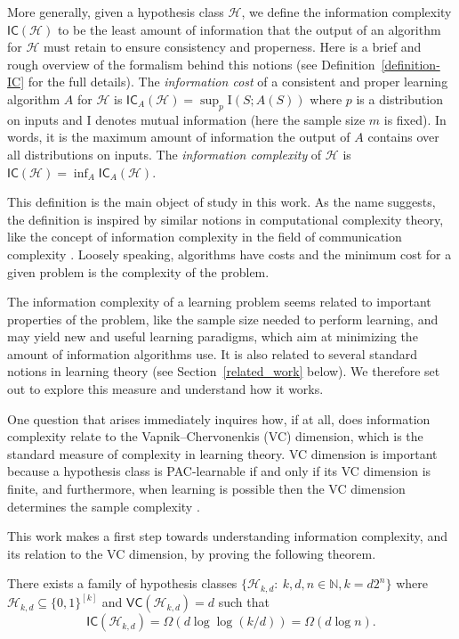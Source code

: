 \documentclass[final,12pt]{colt2018}
\newcommand{\mc}[1]{\mathcal{#1}}
\newcommand{\cH}{\mc{H}}
\newcommand{\II}[1]{\mathrm{I}\left(#1\right)}
\newcommand{\IC}{\mathsf{IC}}
\newcommand{\VC}{\mathsf{VC}}
\begin{document}
More generally, given a hypothesis class $\cH$, we define the information complexity $\IC(\cH)$ to be the least amount of information that the output of an algorithm for $\cH$ must retain to ensure consistency and properness. 
{Here is a brief and rough overview of the formalism behind this notions
(see Definition~\ref{definition-IC} for the full details).
The {\em information cost} of a consistent and proper learning algorithm $A$ for $\cH$
is $\IC_{A}(\cH) = \sup_p \II{S;A(S)}$ where $p$ is a distribution on inputs and $\mathrm{I}$ denotes mutual information (here the sample size $m$ is fixed). 
In words, it is the maximum amount of information the output of $A$ contains
over all distributions on inputs.
The {\em information complexity} of $\cH$
is $\IC(\cH) = \inf_A \IC_A(\cH)$.
} 



This definition is the main object of study in this work. As the name suggests, 
the definition is inspired by {similar notions in computational
complexity theory, like} the concept of information complexity in the field of communication complexity \citep[see e.g.][]{braverman2012interactive}.
{Loosely speaking, algorithms have costs and the minimum cost 
for a given problem is the complexity of the problem.}

{The information complexity of a learning problem seems related
to important properties of the problem, like the sample size needed to perform learning,
and may yield new and useful learning paradigms,
which aim at minimizing the amount of information algorithms use.
It is also related to several standard notions in learning theory
(see Section~\ref{related_work} below).}
We therefore set out to explore this measure and understand how it works. 

One question that arises immediately inquires how, if at all, does information complexity relate to the Vapnik--Chervonenkis (VC) dimension, which is the standard measure of complexity in learning theory. VC dimension is important because a hypothesis class is PAC-learnable if and only if its VC dimension is finite, and furthermore, when learning is possible then the VC dimension determines the sample complexity \citep{vapnik1971uniform, blumer1989learnability}. 

This work makes a first step towards understanding information complexity, and its relation to the VC dimension, by proving the following theorem.

\begin{theorem}\label{general-lower-bound} 
There exists a family of hypothesis classes $\{\cH_{k,d}:\: k,d,n \in \mathbb{N}, k=d2^n\}$ where $\cH_{k,d}\subseteq \{0,1\}^{[k]}$ and $\VC(\cH_{k,d})=d$
such that
\[
\IC(\cH_{k,d})=\Omega\left(d\log \log \left(k /d\right)\right)=\Omega\left(d\log n\right) .
\]
\end{theorem}
\end{document}
